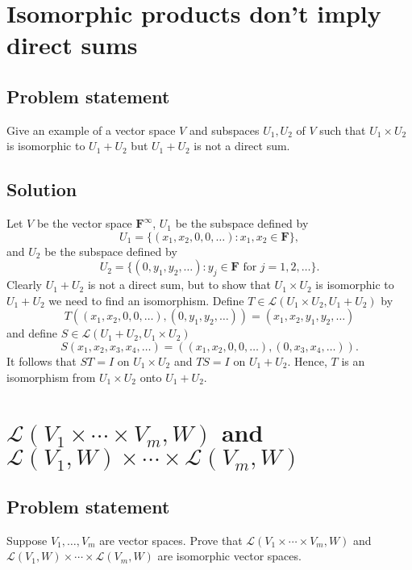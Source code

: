 \documentclass{article}
\begin{document}
\clearpage

\section{Isomorphic products don't imply direct sums}
\subsection*{Problem statement}
Give an example of a vector space $V$ and subspaces $U_1,U_2$ of $V$ such that $U_1\times U_2$ is isomorphic to $U_1+U_2$ but $U_1+U_2$ is not a direct sum.

\subsection*{Solution}
Let $V$ be the vector space $\mathbf{F}^\infty$, $U_1$ be the subspace defined by
\[U_1=\{(x_1,x_2,0,0,\ldots):x_1,x_2\in\mathbf{F}\},\]
and $U_2$ be the subspace defined by 
\[U_2=\{(0,y_1,y_2,\ldots):y_j\in\mathbf{F}\text{ for }j=1,2,\ldots\}.\]
Clearly $U_1+U_2$ is not a direct sum, but to show that $U_1\times U_2$ is isomorphic to $U_1+U_2$ we need to find an isomorphism. 
Define $T\in\mathcal{L}(U_1\times U_2,U_1+U_2)$ by
\[T((x_1,x_2,0,0,\ldots),(0,y_1,y_2,\ldots))=(x_1,x_2,y_1,y_2,\ldots)\]
and define $S\in\mathcal{L}(U_1+U_2,U_1\times U_2)$
\[S(x_1,x_2,x_3,x_4,\ldots)=((x_1,x_2,0,0,\ldots),(0,x_3,x_4,\ldots)).\]
It follows that $ST=I$ on $U_1\times U_2$ and $TS=I$ on $U_1+U_2$. 
Hence, $T$ is an isomorphism from $U_1\times U_2$ onto $U_1+U_2$.

\clearpage

\section{$\mathcal{L}(V_1\times\cdots\times V_m,W)$ and $\mathcal{L}(V_1,W)\times\cdots\times\mathcal{L}(V_m,W)$}
\subsection*{Problem statement}
Suppose $V_1,\ldots,V_m$ are vector spaces. 
Prove that $\mathcal{L}(V_1\times\cdots\times V_m,W)$ and $\mathcal{L}(V_1,W)\times\cdots\times\mathcal{L}(V_m,W)$ are isomorphic vector spaces.
\end{document}
